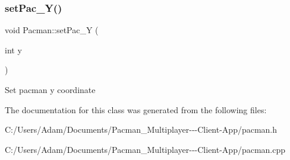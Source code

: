 \subsubsection{\texorpdfstring{set\+Pac\+\_\+\+Y()}{setPac\_Y()}}
{\footnotesize\ttfamily void Pacman\+::set\+Pac\+\_\+Y (\begin{DoxyParamCaption}\item[{int}]{y }\end{DoxyParamCaption})}

Set pacman y coordinate 

The documentation for this class was generated from the following files\+:\begin{DoxyCompactItemize}
\item 
C\+:/\+Users/\+Adam/\+Documents/\+Pacman\+\_\+\+Multiplayer-\/-\/-\/\+Client-\/\+App/pacman.\+h\item 
C\+:/\+Users/\+Adam/\+Documents/\+Pacman\+\_\+\+Multiplayer-\/-\/-\/\+Client-\/\+App/pacman.\+cpp\end{DoxyCompactItemize}
